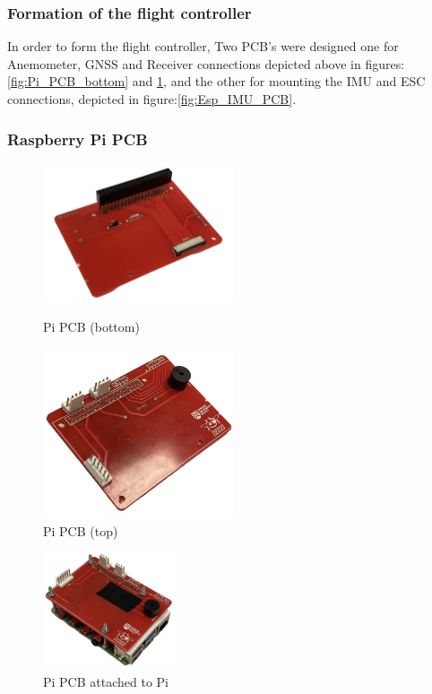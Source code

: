 \documentclass{article}
\begin{document}
\subsubsection*{Formation of the flight controller}
In order to form the flight controller, Two PCB's were designed one for Anemometer, GNSS and Receiver connections depicted above in figures:\ref{fig:Pi_PCB_bottom} and \ref{fig:Pi_PCB_top}, and the other for mounting the IMU and ESC connections, depicted in figure:\ref{fig:Esp_IMU_PCB}.
\subsubsection{Raspberry Pi PCB}
\begin{figure}[H]
  \begin{minipage}{0.5\textwidth}
    \centering
    \includegraphics[width=0.5\textwidth]{Pictures/Pi_PCB_bottom.png}
    \caption{Pi PCB (bottom)}
    \label{fig:Pi_PCB_bottom}
  \end{minipage}
  \begin{minipage}{0.5\textwidth}
    \centering
    \includegraphics[width=0.5\textwidth]{Pictures/Pi_PCB_top.png}
    \caption{Pi PCB (top)}
    \label{fig:Pi_PCB_top}
  \end{minipage}
\end{figure}
\begin{figure}[H]
  \centering
  \includegraphics[width=0.35\textwidth]{Pictures/Pi_PCB_on_Pi.png}
  \caption{Pi PCB attached to Pi}
  \label{fig:Pi_PCB_on_Pi}
\end{figure}
\end{document}
